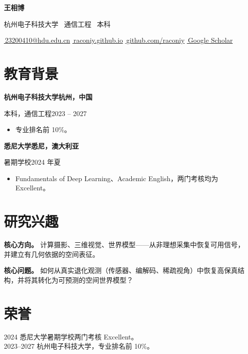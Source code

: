\documentclass[10pt,a4paper]{article}
\newcommand{\aiGoogleScholar}{{\AIfont\symbol{"E9D4}}}
\newcommand{\cvlink}[2]{\href{#1}{#2}}
\newcommand{\icon}[1]{{\color{accent}\footnotesize #1}}
\newcommand{\contact}[3]{\cvlink{#1}{\icon{#2}\,\small #3}}
\newcommand{\entry}[4]{%
  \par\vspace{1pt}%
  \noindent\textbf{#1}\hfill\textbf{#2}\par
  {\small #3\hfill #4}\par
}
\begin{document}
{\fontsize{22pt}{24pt}\selectfont\bfseries 王相博}

\vspace{2pt}
{\small 杭州电子科技大学 \textperiodcentered\ 通信工程 \textperiodcentered\ 本科}

\vspace{5pt}
\contact{mailto:23200410@hdu.edu.cn}{\faEnvelope}{23200410@hdu.edu.cn}
\;{\color{accent}\textbar}\;
\contact{https://raconiy.github.io/}{\faHome}{raconiy.github.io}
\;{\color{accent}\textbar}\;
\contact{https://github.com/raconiy}{\faGithub}{github.com/raconiy}
\;{\color{accent}\textbar}\;
\contact{https://scholar.google.com/citations?user=8E-eDOIAAAAJ}{\aiGoogleScholar}{Google Scholar}

\section{教育背景}

\entry{杭州电子科技大学}{杭州，中国}
{本科，通信工程}{2023 -- 2027}
\begin{itemize}
  \item 专业排名前 10\%。
\end{itemize}

\vspace{3pt}
\entry{悉尼大学}{悉尼，澳大利亚}
{暑期学校}{2024 年夏}
\begin{itemize}
  \item Fundamentals of Deep Learning、Academic English，两门考核均为 Excellent。
\end{itemize}

\section{研究兴趣}

\noindent\textbf{核心方向。}
计算摄影、三维视觉、世界模型——从非理想采集中恢复可用信号，并建立有几何依据的空间表征。

\vspace{3pt}
\noindent\textbf{核心问题。}
如何从真实退化观测（传感器、编解码、稀疏视角）中恢复高保真结构，并将其转化为可预测的空间世界模型？

\section{荣誉}

2024 \quad 悉尼大学暑期学校两门考核 Excellent。\\
2023--2027 \quad 杭州电子科技大学，专业排名前 10\%。
\end{document}
